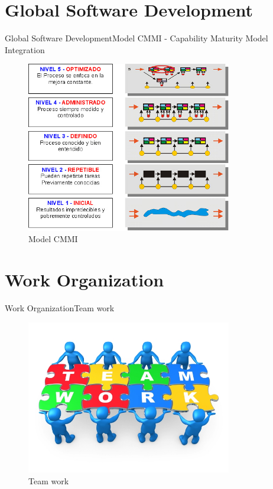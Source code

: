 \documentclass[10pt]{beamer}
\begin{document}

\section{Global Software Development}
\begin{frame}{Global Software Development}{Model CMMI - Capability Maturity Model Integration}  
	\begin{figure}[H] 
		\begin{flushleft}
			\includegraphics[width=0.80\textwidth]{./AAUgraphics/cmmi.jpg}
			\caption{Model CMMI}
			\label{DCP}
		\end{flushleft}
	\end{figure}
\end{frame}


\section{Work Organization}
\begin{frame}{Work Organization}{Team work}  
	\begin{figure}[H] 
		\begin{flushleft}
			\includegraphics[width=0.80\textwidth]{./AAUgraphics/Organization-Work.jpg}
			\caption{Team work}
			\label{DCP}
		\end{flushleft}
	\end{figure}
\end{frame}
\end{document}

